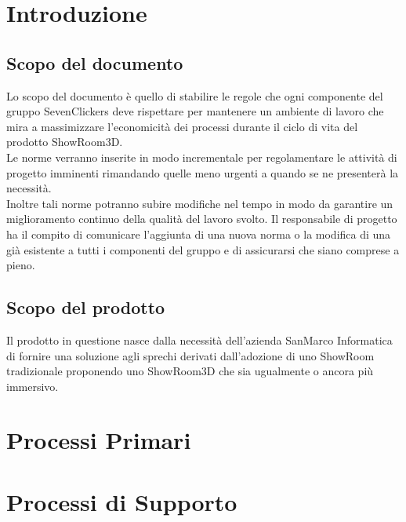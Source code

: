 \documentclass[a4paper]{article}
\begin{document}




\pagebreak

{
    \hypersetup{linkcolor=black}
    \tableofcontents
}
\pagebreak

\section{Introduzione}
\subsection{Scopo del documento}
Lo scopo del documento è quello di stabilire le regole che ogni componente del gruppo SevenClickers
deve rispettare per mantenere un ambiente di lavoro che mira a massimizzare
l'economicità dei processi durante il ciclo di vita del prodotto ShowRoom3D.\\
Le norme verranno inserite in modo incrementale per regolamentare le attività di progetto imminenti rimandando quelle meno urgenti a quando 
se ne presenterà la necessità.\\
Inoltre tali norme potranno subire modifiche nel tempo in modo da garantire un miglioramento continuo della qualità del lavoro svolto.
Il responsabile di progetto ha il compito di comunicare l'aggiunta di una nuova norma o la modifica di una già esistente a tutti i componenti
del gruppo e di assicurarsi che siano comprese a pieno.
\subsection{Scopo del prodotto}
Il prodotto in questione nasce dalla necessità dell'azienda SanMarco Informatica di fornire una soluzione agli sprechi
derivati dall'adozione di uno ShowRoom tradizionale proponendo uno ShowRoom3D che sia 
ugualmente o ancora più immersivo.
\pagebreak
\section{Processi Primari}


\pagebreak
\section{Processi di Supporto}

\pagebreak

\pagebreak

\pagebreak

\pagebreak

\pagebreak
\end{document}

